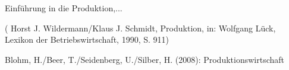 

\clearpage
{}




\begin{thebibliography}{99}

	
	Einführung in die Produktion,... 	

( Horst J. Wildermann/Klaus J. Schmidt, Produktion, in: Wolfgang Lück, Lexikon der Betriebswirtschaft, 1990, S. 911)

Blohm, H./Beer, T./Seidenberg, U./Silber, H. (2008): Produktionswirtschaft
 	
 	
\end{thebibliography}